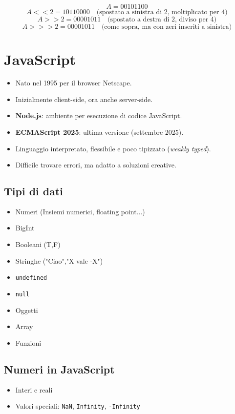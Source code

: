 \documentclass[12pt]{article}
\let\oldsection\section
\renewcommand{\section}{\clearpage\oldsection}
\begin{document}
\[
A = 00101100
\]
\[
A << 2 = 10110000 \quad \text{(spostato a sinistra di 2, moltiplicato per 4)}
\]
\[
A >> 2 = 00001011 \quad \text{(spostato a destra di 2, diviso per 4)}
\]
\[
A >>> 2 = 00001011 \quad \text{(come sopra, ma con zeri inseriti a sinistra)}
\]

\section{JavaScript}

\begin{itemize}
  \item Nato nel 1995 per il browser Netscape.
  \item Inizialmente client-side, ora anche server-side.
  \item \textbf{Node.js}: ambiente per esecuzione di codice JavaScript.
  \item \textbf{ECMAScript 2025}: ultima versione (settembre 2025).
  \item Linguaggio interpretato, flessibile e poco tipizzato (\textit{weakly typed}).
  \item Difficile trovare errori, ma adatto a soluzioni creative.
\end{itemize}

\subsection{Tipi di dati}
\begin{itemize}
  \item Numeri (Insiemi numerici, floating point...)
  \item BigInt
  \item Booleani (T,F)
  \item Stringhe ("Ciao","X vale -X")
  \item \texttt{undefined}
  \item \texttt{null}
  \item Oggetti
  \item Array
  \item Funzioni
\end{itemize}

\subsection{Numeri in JavaScript}
\begin{itemize}
  \item Interi e reali
  \item Valori speciali: \texttt{NaN}, \texttt{Infinity}, \texttt{-Infinity}
\end{itemize}
\end{document}
